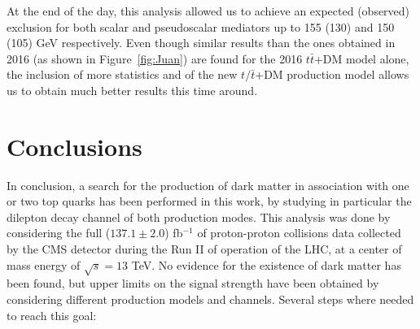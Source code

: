 \documentclass[a4paper, 10pt, openright]{report}
\begin{document}
At the end of the day, this analysis allowed us to achieve an expected (observed) exclusion for both scalar and pseudoscalar mediators up to 155 (130) and 150 (105) GeV respectively. Even though similar results than the ones obtained in 2016 (as shown in Figure~\ref{fig:Juan}) are found for the 2016 $t \bar t$+DM model alone, the inclusion of more statistics and of the new $t/ \bar t$+DM production model allows us to obtain much better results this time around.





























\chapter{Conclusions} \label{chapter:Conclusion}

In conclusion, a search for the production of dark matter in association with one or two top quarks has been performed in this work, by studying in particular the dilepton decay channel of both production modes. This analysis was done by considering the full ($137.1 \pm 2.0$) fb$^{-1}$ of proton-proton collisions data collected by the \ac{CMS} detector during the Run II of operation of the \ac{LHC}, at a center of mass energy of $\sqrt{s} = 13$ TeV. No evidence for the existence of dark matter has been found, but upper limits on the signal strength have been obtained by considering different production models and channels.  Several steps where needed to reach this goal:
\end{document}
